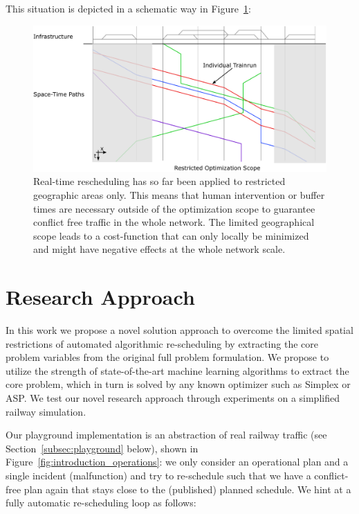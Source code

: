 \documentclass{article}
\begin{document}
This situation is depicted in a schematic way in Figure~\ref{fig:introduction_compensation}:
%
\begin{figure}[hbtp]
	\centering
  \includegraphics[width=\textwidth]{Figures/rsp_rescheduling_heute.pdf}
	\caption{Real-time rescheduling has so far been applied to restricted geographic areas only. This means that human intervention or buffer times are necessary outside of the optimization scope to guarantee conflict free traffic in the whole network. The limited geographical scope leads to a cost-function that can only locally be minimized and might have negative effects at the whole network scale.}
	\label{fig:introduction_compensation}
\end{figure}




\section{Research Approach}\label{sec:researchapproach}
In this work we propose a novel solution approach to overcome the limited spatial restrictions of automated algorithmic re-scheduling by extracting the core problem variables from the original full problem formulation. We propose to utilize the strength of state-of-the-art machine learning algorithms to extract the core problem, which in turn is solved by any known optimizer such as Simplex or ASP. We test our novel research approach through experiments on a simplified railway simulation.


Our playground implementation is an abstraction of real railway traffic (see Section~\ref{subsec:playground} below), shown in Figure~\ref{fig:introduction_operations}: we only consider an operational plan and a single incident (malfunction) and try to re-schedule such that we have a conflict-free plan again that stays close to the (published) planned schedule. We hint at a fully automatic re-scheduling loop as follows:
\end{document}
